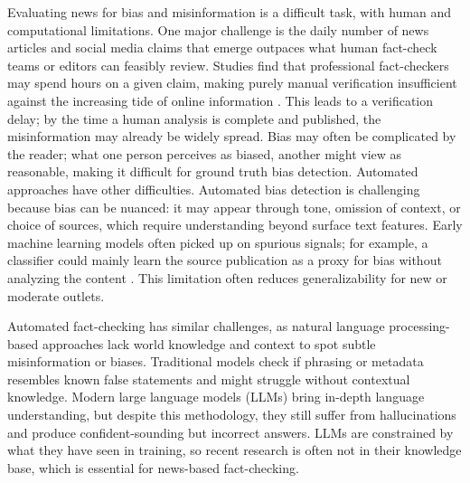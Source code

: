 \documentclass[11pt]{article}
\begin{document}
Evaluating news for bias and misinformation is a difficult task, with human and computational limitations. One major challenge is the daily number of news articles and social media claims that emerge outpaces what human fact-check teams or editors can feasibly review. Studies find that professional fact-checkers may spend hours on a given claim, making purely manual verification insufficient against the increasing tide of online information \cite{r12}. This leads to a verification delay; by the time a human analysis is complete and published, the misinformation may already be widely spread. Bias may often be complicated by the reader; what one person perceives as biased, another might view as reasonable, making it difficult for ground truth bias detection.
Automated approaches have other difficulties. Automated bias detection is challenging because bias can be nuanced: it may appear through tone, omission of context, or choice of sources, which require understanding beyond surface text features. Early machine learning models often picked up on spurious signals; for example, a classifier could mainly learn the source publication as a proxy for bias without analyzing the content \cite{r13}. This limitation often reduces generalizability for new or moderate outlets.


Automated fact-checking has similar challenges, as natural language processing-based approaches lack world knowledge and context to spot subtle misinformation or biases. Traditional models check if phrasing or metadata resembles known false statements and might struggle without contextual knowledge. Modern large language models (LLMs) bring in-depth language understanding, but despite this methodology, they still suffer from hallucinations and produce confident-sounding but incorrect answers\cite{r14}. LLMs are constrained by what they have seen in training, so recent research is often not in their knowledge base, which is essential for news-based fact-checking.
 
\end{document}
